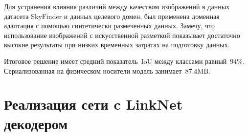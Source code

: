 Для устранения влияния различий между качеством изображений в данных датасета SkyFinder и данных целевого домен,
был применена доменная адаптация с помощью синтетически размеченных данных.
Замечу, что использование изображений с искусственной разметкой показывает достаточно высокие результаты
при низких временных затратах на подготовку данных.

Итоговое решение имеет средний показатель~$\mathrm{IoU}$ между классами равный~$94\%$.
Сериализованная на физическом носители модель занимает~$87.4\mathrm{MB}$.

\appendix

\section{Реализация сети c LinkNet декодером}

